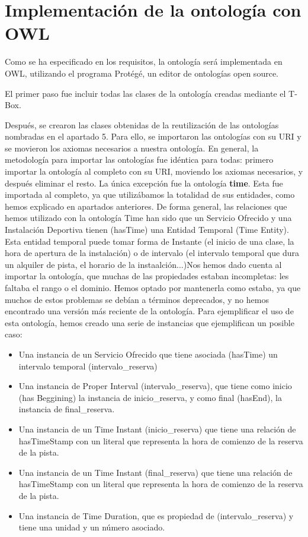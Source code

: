 \documentclass[a4paper,12pt]{article}
\begin{document}
	\section{Implementación de la ontología con OWL}
	
	Como se ha especificado en los requisitos, la ontología será implementada en OWL, utilizando el programa Protégé, un editor de ontologías open source.
	
	El primer paso fue incluir todas las clases de la ontología creadas mediante el T-Box.
	
	Después, se crearon las clases obtenidas de la reutilización de las ontologías nombradas en el apartado 5. Para ello, se importaron las ontologías con su URI y se movieron los axiomas necesarios a nuestra ontología. En general, la metodología para importar las ontologías fue idéntica para todas: primero importar la ontología al completo con su URI, moviendo los axiomas necesarios, y después eliminar el resto. La única excepción fue la ontología \textbf{time}. Esta fue importada al completo, ya que utilizábamos la totalidad de sus entidades, como hemos explicado en apartados anteriores. De forma general, las relaciones que hemos utilizado con la ontología Time han sido que un Servicio Ofrecido y una Instalación Deportiva tienen (hasTime) una Entidad Temporal (Time Entity). Esta entidad temporal puede tomar forma de Instante (el inicio de una clase, la hora de apertura de la instalación) o de intervalo (el intervalo temporal que dura un alquiler de pista, el horario de la instaalción...)Nos hemos dado cuenta al importar la ontología, que muchas de las propiedades estaban incompletas: les faltaba el rango o el dominio. Hemos optado por mantenerla como estaba, ya que muchos de estos problemas se debían a términos deprecados, y no hemos encontrado una versión más reciente de la ontología. Para ejemplificar el uso de esta ontología, hemos creado una serie de instancias que ejemplifican un posible caso:
	\begin{itemize}
	    \item Una instancia de un Servicio Ofrecido que tiene asociada (hasTime) un intervalo temporal (intervalo\_reserva)
	    \item Una instancia de Proper Interval (intervalo\_reserva), que tiene como inicio (has Beggining) la instancia de inicio\_reserva, y como final (hasEnd), la instancia de final\_reserva.
	    \item Una instancia de un Time Instant (inicio\_reserva) que tiene una relación de hasTimeStamp con un literal que representa la hora de comienzo de la reserva de la pista.
	    \item Una instancia de un Time Instant (final\_reserva) que tiene una relación de hasTimeStamp con un literal que representa la hora de comienzo de la reserva de la pista.
	    \item Una instancia de Time Duration, que es propiedad de (intervalo\_reserva) y tiene una unidad y un número asociado. 
	    
	\end{itemize}
	
\end{document}
